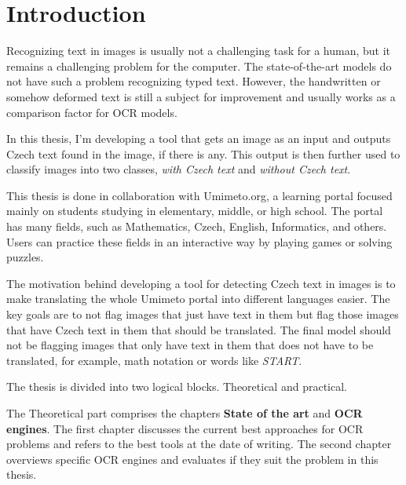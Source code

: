 \documentclass[
  digital,     %
  oneside,     %
  nosansbold,  %
  nocolorbold, %
  nolof,         %
  nolot,         %
]{fithesis4}
\begin{document}

\chapter{Introduction}

Recognizing text in images is usually not a challenging task for a human, but it remains a challenging problem for the computer. The state-of-the-art models do not have such a problem recognizing typed text. However, the handwritten or somehow deformed text is still a subject for improvement and usually works as a comparison factor for OCR models.

In this thesis, I'm developing a tool that gets an image as an input and outputs Czech text found in the image, if there is any. This output is then further used to classify images into two classes, \emph{with Czech text} and \emph{without Czech text}.

This thesis is done in collaboration with Umimeto.org\cite{umimeto}, a learning portal focused mainly on students studying in elementary, middle, or high school. The portal has many fields, such as Mathematics, Czech, English, Informatics, and others. Users can practice these fields in an interactive way by playing games or solving puzzles.

The motivation behind developing a tool for detecting Czech text in images is to make translating the whole Umimeto portal into different languages easier. The key goals are to not flag images that just have text in them but flag those images that have Czech text in them that should be translated. The final model should not be flagging images that only have text in them that does not have to be translated, for example, math notation or words like \emph{START}.

The thesis is divided into two logical blocks. Theoretical and practical.

The Theoretical part comprises the chapters \textbf{State of the art} and \textbf{OCR engines}. The first chapter discusses the current best approaches for OCR problems and refers to the best tools at the date of writing. The second chapter overviews specific OCR engines and evaluates if they suit the problem in this thesis.
\end{document}
